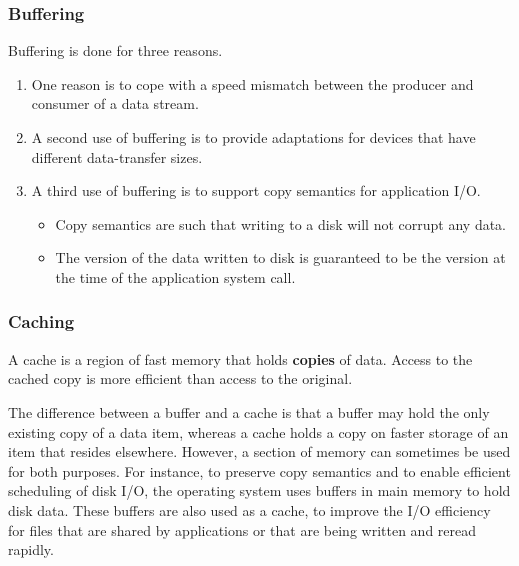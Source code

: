 \subsubsection{Buffering}\label{subsubsec:IO_Buffering}
Buffering is done for three reasons.
\begin{enumerate}[noitemsep]
\item One reason is to cope with a speed mismatch between the producer and consumer of a data stream.
\item A second use of buffering is to provide adaptations for devices that have different data-transfer sizes.
\item A third use of buffering is to support copy semantics for application I/O.
  \begin{itemize}[noitemsep]
  \item Copy semantics are such that writing to a disk will not corrupt any data.
  \item The version of the data written to disk is guaranteed to be the version at the time of the application system call.
  \end{itemize}
\end{enumerate}

\subsubsection{Caching}\label{subsubsec:IO_Caching}
A cache is a region of fast memory that holds \textbf{copies} of data.
Access to the cached copy is more efficient than access to the original.

The difference between a buffer and a cache is that a buffer may hold the only existing copy of a data item, whereas a cache holds a copy on faster storage of an item that resides elsewhere.
However, a section of memory can sometimes be used for both purposes.
For instance, to preserve copy semantics and to enable efficient scheduling of disk I/O, the operating system uses buffers in main memory to hold disk data.
These buffers are also used as a cache, to improve the I/O efficiency for files that are shared by applications or that are being written and reread rapidly.



